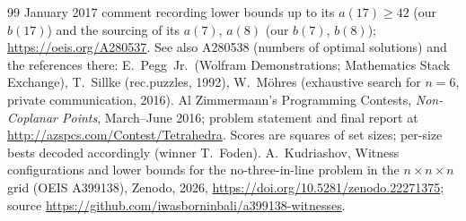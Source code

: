 \documentclass[11pt,a4paper]{article}
\begin{document}
\begin{thebibliography}{99}
January 2017 comment recording lower bounds up to its $a(17)\ge42$ (our $b(17)$) and the sourcing of its $a(7)$, $a(8)$
(our $b(7)$, $b(8)$); \url{https://oeis.org/A280537}.  See also A280538 (numbers of optimal solutions) and the
references there: E.~Pegg~Jr.\ (Wolfram Demonstrations; Mathematics Stack Exchange), T.~Sillke
(rec.puzzles, 1992), W.~M\"ohres (exhaustive search for $n=6$, private communication, 2016).
 Al Zimmermann's Programming Contests, \emph{Non-Coplanar Points}, March--June
2016; problem statement and final report at \url{http://azspcs.com/Contest/Tetrahedra}.  Scores
are squares of set sizes; per-size bests decoded accordingly (winner T.~Foden).
 A.~Kudriashov, Witness configurations and lower bounds for the no-three-in-line problem in the
$n\times n\times n$ grid (OEIS A399138), Zenodo, 2026, \url{https://doi.org/10.5281/zenodo.22271375}; source
\url{https://github.com/iwasborninbali/a399138-witnesses}.
\end{thebibliography}
\end{document}
